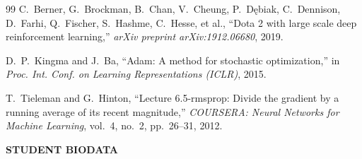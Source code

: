 \documentclass[12pt,a4paper]{report}
\begin{document}
\begin{thebibliography}{99}
C.~Berner, G.~Brockman, B.~Chan, V.~Cheung, P.~D{\k{e}}biak, C.~Dennison, D.~Farhi, Q.~Fischer, S.~Hashme, C.~Hesse, et al.,
``Dota 2 with large scale deep reinforcement learning,''
\textit{arXiv preprint arXiv:1912.06680}, 2019.

D.~P.~Kingma and J.~Ba,
``Adam: A method for stochastic optimization,''
in \textit{Proc. Int. Conf. on Learning Representations (ICLR)}, 2015.

T.~Tieleman and G.~Hinton,
``Lecture 6.5-rmsprop: Divide the gradient by a running average of its recent magnitude,''
\textit{COURSERA: Neural Networks for Machine Learning}, vol.~4, no.~2, pp.~26--31, 2012.

\end{thebibliography}

\newpage
\thispagestyle{plain}
\begin{center}
    \large \textbf{STUDENT BIODATA}
\end{center}
\vspace{0.8cm}
\end{document}
